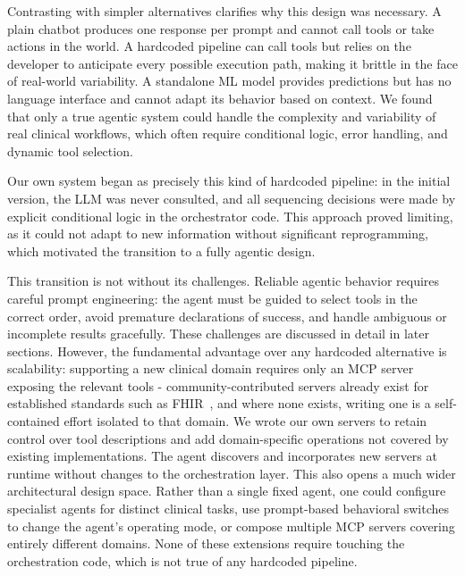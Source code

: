 \documentclass[conference]{IEEEtran}
\begin{document}
Contrasting with simpler alternatives clarifies why this design was necessary.
A plain chatbot produces one response per prompt and cannot call tools or take actions in the world. A hardcoded pipeline can call tools but relies on the developer to anticipate every possible execution path, making it brittle in the face of real-world variability. A standalone ML model provides predictions but has no language interface and cannot adapt its behavior based on context. We found that only a true agentic system could handle the complexity and variability of real clinical workflows, which often require conditional logic, error handling, and dynamic tool selection.

Our own system began as precisely this kind of hardcoded pipeline: in the initial version, the LLM was never consulted, and all sequencing decisions were made by explicit conditional logic in the orchestrator code. This approach proved limiting, as it could not adapt to new information without significant reprogramming, which motivated the transition to a fully agentic design.

This transition is not without its challenges. Reliable agentic behavior requires careful prompt engineering: the agent must be guided to select tools in the correct order, avoid premature declarations of success, and handle ambiguous or incomplete results gracefully. These challenges are discussed in detail in later sections.
However, the fundamental advantage over any hardcoded alternative is scalability: supporting a new clinical domain requires only an MCP server exposing the relevant tools - community-contributed servers already exist for established standards such as FHIR~\cite{ehtesham2025mcpfhir}, and where none exists, writing one is a self-contained effort isolated to that domain. We wrote our own servers to retain control over tool descriptions and add domain-specific operations not covered by existing implementations. The agent discovers and incorporates new servers at runtime without changes to the orchestration layer. This also opens a much wider architectural design space. Rather than a single fixed agent, one could configure specialist agents for distinct clinical tasks, use prompt-based behavioral switches to change the agent's operating mode, or compose multiple MCP servers covering entirely different domains.
None of these extensions require touching the orchestration code, which is not true of any hardcoded pipeline.

\end{document}
